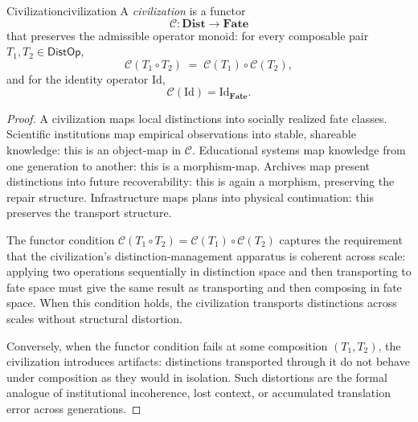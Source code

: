 \documentclass[12pt,twoside,openright]{book}
\newcommand{\distOp}{\mathsf{DistOp}}
\newcommand{\catDist}{\mathbf{Dist}}
\newcommand{\catFate}{\mathbf{Fate}}
\newcommand{\civFunc}{\mathcal{C}}
\providecommand{\catDist}{\mathbf{Dist}}
\providecommand{\catFate}{\mathbf{Fate}}
\providecommand{\civFunc}{\mathcal{C}}
\begin{document}
\begin{theorem}{Civilization}{civilization}
A \emph{civilization} is a functor
\[
  \civFunc:\catDist\longrightarrow\catFate
\]
that preserves the admissible operator monoid: for every
composable pair $T_1,T_2\in\distOp$,
\[
  \civFunc(T_1\circ T_2)
  \;=\;
  \civFunc(T_1)\circ\civFunc(T_2),
\]
and for the identity operator $\mathrm{Id}$,
\[
  \civFunc(\mathrm{Id}) = \mathrm{Id}_{\catFate}.
\]
\begin{proof}
A civilization maps local distinctions into socially realized
fate classes. Scientific institutions map empirical
observations into stable, shareable knowledge: this is an
object-map in $\civFunc$. Educational systems map knowledge
from one generation to another: this is a morphism-map.
Archives map present distinctions into future recoverability:
this is again a morphism, preserving the repair structure.
Infrastructure maps plans into physical continuation:
this preserves the transport structure.

The functor condition $\civFunc(T_1\circ T_2)=\civFunc(T_1)
\circ\civFunc(T_2)$ captures the requirement that the
civilization's distinction-management apparatus is coherent
across scale: applying two operations sequentially in
distinction space and then transporting to fate space must give
the same result as transporting and then composing in fate space.
When this condition holds, the civilization transports
distinctions across scales without structural distortion.

Conversely, when the functor condition fails at some
composition $(T_1, T_2)$, the civilization introduces
artifacts: distinctions transported through it do not behave
under composition as they would in isolation. Such distortions
are the formal analogue of institutional incoherence, lost
context, or accumulated translation error across generations.
\end{proof}
\end{theorem}
\end{document}
